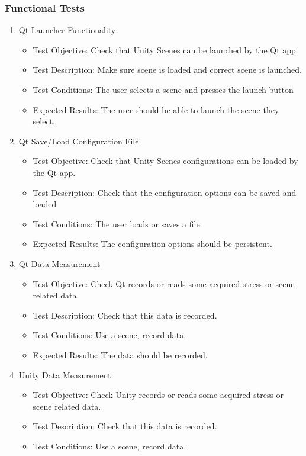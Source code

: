 \documentclass[a4paper,10pt]{article}
\begin{document}
\subsubsection{Functional Tests}
\begin{enumerate}
    \item  Qt Launcher Functionality
    \begin{itemize}
	\item Test Objective: Check that Unity Scenes can be launched by the Qt app.
	\item Test Description: Make sure scene is loaded and correct scene is launched.
	\item Test Conditions: The user selects a scene and presses the launch button
	\item Expected Results: The user should be able to launch the scene they select.
    \end{itemize}
    \item  Qt Save/Load Configuration File
    \begin{itemize}
	\item Test Objective: Check that Unity Scenes configurations can be loaded by the Qt app.
	\item Test Description: Check that the configuration options can be saved and loaded
	\item Test Conditions: The user loads or saves a file. 
	\item Expected Results: The configuration options should be persistent.
    \end{itemize}
    \item  Qt Data Measurement
    \begin{itemize}
	\item Test Objective: Check Qt records or reads some acquired stress or scene related data.
	\item Test Description: Check that this data is recorded.
	\item Test Conditions: Use a scene, record data.
	\item Expected Results: The data should  be recorded.
    \end{itemize}
    \item  Unity Data Measurement
    \begin{itemize}
	\item Test Objective: Check Unity records or reads some acquired stress or scene related data.
	\item Test Description: Check that this data is recorded.
	\item Test Conditions: Use a scene, record data.

\end{itemize}
\end{enumerate}
\end{document}
